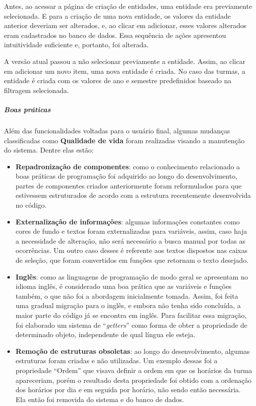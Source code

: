 Antes, ao acessar a página de criação de entidades, uma entidade era previamente selecionada. E para a criação de uma nova entidade, os valores da entidade anterior deveriam ser alterados, e, ao clicar em adicionar, esses valores alterados eram cadastrados no banco de dados. Essa sequência de ações apresentou intuitividade suficiente e, portanto, foi alterada.

A versão atual passou a não selecionar previamente a entidade. Assim, ao clicar em adicionar um novo item, uma nova entidade é criada. No caso das turmas, a entidade é criada com os valores de ano e semestre predefinidos baseado na filtragem selecionada.

\subparagraph*{Boas práticas}

Além das funcionalidades voltadas para o usuário final, algumas mudanças classificadas como \textbf{Qualidade de vida} foram realizadas visando a manutenção do sistema. Dentre elas estão:

\begin{itemize}
  \item \textbf{Repadronização de componentes}: como o conhecimento relacionado a boas práticas de programação foi adquirido ao longo do desenvolvimento, partes de componentes criados anteriormente foram reformulados para que estivessem estruturados de acordo com a estrutura recentemente desenvolvida no código.
  \item \textbf{Externalização de informações}: algumas informações constantes como cores de fundo e textos foram externalizadas para variáveis, assim, caso haja a necessidade de alteração, não será necessário a busca manual por todas as ocorrências. Um outro caso desses é referente aos textos dispostos nas caixas de seleção, que foram convertidos em funções que retornam o texto desejado.
  \item \textbf{Inglês}: como as linguagens de programação de modo geral se apresentam no idioma inglês, é considerado uma boa prática que as variáveis e funções também, o que não foi a abordagem inicialmente tomada. Assim, foi feita uma gradual migração para o inglês, e embora não tenha sido concluída, a maior parte do código já se encontra em inglês. Para facilitar essa migração, foi elaborado um sistema de ``\textit{getters}'' como forma de obter a propriedade de determinado objeto, independente de qual língua ele esteja.
  \item \textbf{Remoção de estruturas obsoletas}: ao longo do desenvolvimento, algumas estruturas foram criadas e não utilizadas. Um exemplo dessas foi a propriedade ``Ordem'' que visava definir a ordem em que os horários da turma apareceriam, porém o resultado desta propriedade foi obtido com a ordenação dos horários por dia e em seguida por horário, não sendo então necessária. Ela então foi removida do sistema e do banco de dados.
\end{itemize}

